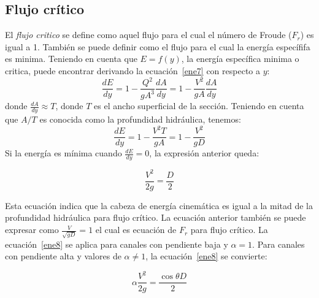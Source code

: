 \documentclass[11pt, oneside]{article}
\begin{document}
\subsection{Flujo cr\'itico}
El \emph{flujo critico} se define como aquel flujo para el cual el n\'umero de Froude ($F_r$) es igual a 1. Tambi\'en se puede definir como el flujo para el cual la energ\'ia espec\'ififa es minima. Teniendo en cuenta que $E=f(y)$, la energ\'ia espec\'ifica minima o critica, puede encontrar derivando la ecuaci\'on~\ref{ene7} con respecto a $y$:
$$
\frac{dE}{dy} = 1 - \frac{Q^2}{gA^3} \frac{dA}{dy} = 1 - \frac{V^2}{gA} \frac{dA}{dy}
$$
donde $\frac{dA}{dy} \approx T$, donde $T$ es el ancho superficial de la secci\'on. Teniendo en cuenta que $A/T$ es conocida como la profundidad hidr\'aulica, tenemos:
$$
\frac{dE}{dy} = 1 -  \frac{V^2 T}{gA} = 1 -  \frac{V^2}{gD} 
$$
Si la energ\'ia es m\'inima cuando  $\frac{dE}{dy}=0$, la expresi\'on anterior queda:

\begin{equation}
\frac{V^2}{2g} = \frac{D}{2} 
\label{ene8}
\end{equation}

Esta ecuaci\'on indica que la cabeza de energ\'ia cinem\'atica es igual a la mitad de la profundidad hidr\'aulica para flujo cr\'itico. La ecuaci\'on anterior tambi\'en se puede expresar como $\frac{V}{\sqrt{gD}}=1$ el cual es ecuaci\'on de $F_r$ para flujo cr\'itico. La ecuaci\'on~\ref{ene8} se aplica para canales con pendiente baja y $\alpha = 1$. Para canales con pendiente alta y valores de $\alpha \ne 1$, la ecuaci\'on~\ref{ene8} se convierte:

\begin{equation}
\alpha \frac{V^2}{2g} = \frac{\cos \theta D}{2} 
\label{ene9}
\end{equation}
\end{document}
